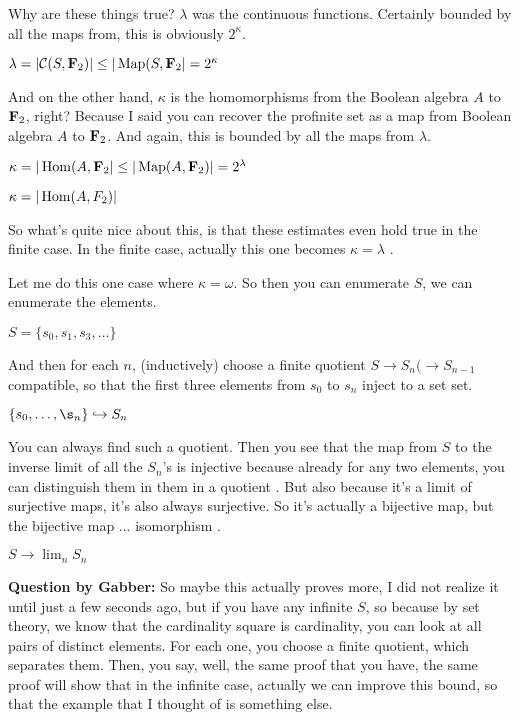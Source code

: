 \begin{example}
\begin{proposition}
\end{proposition}

\begin{sketch}
Why are these things true? 
$\lambda$ was the continuous functions. Certainly bounded by all the maps from, this is obviously $2^{\kappa}$. 

$\lambda = |\mathcal{C}(S, \mathbf F_2)| \leq |\operatorname{Map}(S, \mathbf F_2| = 2^{\kappa}$

And on the other hand, $\kappa$ is the homomorphisms from the Boolean algebra $A$ to $\mathbf F_2$, right? Because I said you can recover the profinite set as a map from Boolean algebra $A$ to $\mathbf F_2$.
And again, this is bounded by all the maps from $\lambda$.

$\kappa = |\operatorname{Hom}(A, \mathbf F_2| \leq |\operatorname{Map}(A, \mathbf F_2)| = 2^{\lambda}$

$\kappa = |\operatorname{Hom}(A, F_2)|$

So what's quite nice about this, is that these estimates even hold true in the finite case. In the finite case, actually this one becomes $\kappa = \lambda$ .

Let me do this one case where $\kappa = \omega$. So then you can enumerate $S$, we can enumerate the elements. 

$S = \{ s_0, s_1, s_3, \dots \} $

And then for each $n$, (inductively) choose a finite quotient $S \to S_n ( \to S_{n-1}$ compatible, so that the first three  elements from $s_0$ to $s_n$ inject to a set set. 


$\{ s_0, \dots, \s_n \} \mono S_n$ 

You can always find such a quotient.
Then you see that the map from $S$ to the inverse limit of all the $S_n$'s is injective because already for any two elements, you can distinguish them in them in a quotient . But also because it's a limit of surjective maps, it's also always surjective. So it's actually a bijective map, but the bijective map ... isomorphism .
 
$S \to \lim_n S_n$  %

\end{sketch}

\textbf{Question by Gabber:} So maybe this actually proves more, I did not realize it until just a few seconds ago, but if you have any infinite $S$, so because by set theory, we know that the cardinality square is cardinality, you can look at all pairs of distinct elements. For each one, you choose a finite quotient, which separates them. Then, you say, well, the same proof that you have, the same proof will show that in the infinite case, actually we can improve this bound, so that the example that I thought of is something else.


\end{example}

